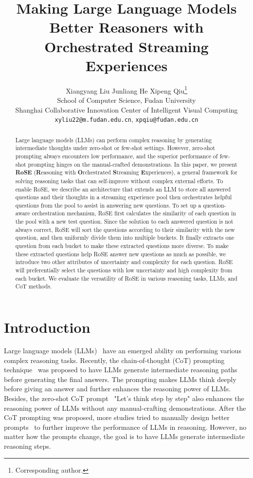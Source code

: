 \documentclass[11pt]{article}
\title{Making Large Language Models Better Reasoners with \\
 Orchestrated Streaming Experiences}
\author{
Xiangyang Liu \quad Junliang He \quad Xipeng Qiu\thanks{ {} Corresponding author.}\\
School of Computer Science, Fudan University \\
Shanghai Collaborative Innovation Center of Intelligent Visual Computing \\
\texttt{xyliu22@m.fudan.edu.cn}, \texttt{xpqiu@fudan.edu.cn}\\
}
\begin{document}
\maketitle
\begin{abstract}
Large language models (LLMs) can perform complex reasoning by generating intermediate thoughts under zero-shot or few-shot settings. However, zero-shot prompting always encounters low performance, and the superior performance of few-shot prompting hinges on the manual-crafted demonstrations. In this paper, we present \textbf{RoSE} (\textbf{R}easoning with \textbf{O}rchestrated  \textbf{S}treaming \textbf{E}xperiences), a general framework for solving reasoning tasks that can self-improve without complex external efforts. To enable RoSE, we describe an architecture that extends an LLM to store all answered questions and their thoughts in a streaming experience pool then orchestrates helpful questions from the pool to assist in answering new questions. To set up a question-aware orchestration mechanism, RoSE first calculates the similarity of each question in the pool with a new test question. Since the solution to each answered question is not always correct, RoSE will sort the questions according to their similarity with the new question, and then uniformly divide them into multiple buckets. It finally extracts one question from each bucket to make these extracted questions more diverse. To make these extracted questions help RoSE answer new questions as much as possible, we introduce two other attributes of uncertainty and complexity for each question. RoSE will preferentially select the questions with low uncertainty and high complexity from each bucket. We evaluate the versatility of RoSE in various reasoning tasks, LLMs, and CoT methods.
\end{abstract}

\section{Introduction}

Large language models (LLMs)~\cite{brown2020gpt3,thoppilan202lamda,chowdhery2022palm,Hoffmann2022chinchilla,ouyang2022instructgpt,zeng2023glm,touvron203llama,openai203gpt4,sun2024moss} have an emerged ability on performing various complex reasoning tasks. Recently, the chain-of-thought (CoT) prompting technique~\cite{wei2022cot} was proposed to have LLMs generate intermediate reasoning paths before generating the final answers. The prompting makes LLMs think deeply before giving an answer and further enhances the reasoning power of LLMs. Besides, the zero-shot CoT prompt~\cite{Kojima022zerocot} "Let's think step by step" also enhances the reasoning power of LLMs without any manual-crafting demonstrations. After the CoT prompting was proposed, more studies tried to manually design better prompts~\cite{zhou2023ltm,wang2023psp,yao2023tot} to further improve the performance of LLMs in reasoning. However, no matter how the prompts change, the goal is to have LLMs generate intermediate reasoning steps. 
\end{document}
